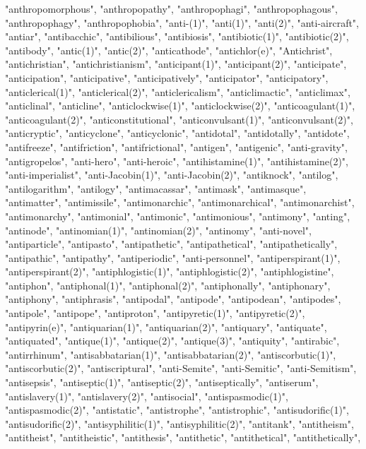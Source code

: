 "anthropomorphous",
"anthropopathy",
"anthropophagi",
"anthropophagous",
"anthropophagy",
"anthropophobia",
"anti-(1)",
"anti(1)",
"anti(2)",
"anti-aircraft",
"antiar",
"antibacchic",
"antibilious",
"antibiosis",
"antibiotic(1)",
"antibiotic(2)",
"antibody",
"antic(1)",
"antic(2)",
"anticathode",
"antichlor(e)",
"Antichrist",
"antichristian",
"antichristianism",
"anticipant(1)",
"anticipant(2)",
"anticipate",
"anticipation",
"anticipative",
"anticipatively",
"anticipator",
"anticipatory",
"anticlerical(1)",
"anticlerical(2)",
"anticlericalism",
"anticlimactic",
"anticlimax",
"anticlinal",
"anticline",
"anticlockwise(1)",
"anticlockwise(2)",
"anticoagulant(1)",
"anticoagulant(2)",
"anticonstitutional",
"anticonvulsant(1)",
"anticonvulsant(2)",
"anticryptic",
"anticyclone",
"anticyclonic",
"antidotal",
"antidotally",
"antidote",
"antifreeze",
"antifriction",
"antifrictional",
"antigen",
"antigenic",
"anti-gravity",
"antigropelos",
"anti-hero",
"anti-heroic",
"antihistamine(1)",
"antihistamine(2)",
"anti-imperialist",
"anti-Jacobin(1)",
"anti-Jacobin(2)",
"antiknock",
"antilog",
"antilogarithm",
"antilogy",
"antimacassar",
"antimask",
"antimasque",
"antimatter",
"antimissile",
"antimonarchic",
"antimonarchical",
"antimonarchist",
"antimonarchy",
"antimonial",
"antimonic",
"antimonious",
"antimony",
"anting",
"antinode",
"antinomian(1)",
"antinomian(2)",
"antinomy",
"anti-novel",
"antiparticle",
"antipasto",
"antipathetic",
"antipathetical",
"antipathetically",
"antipathic",
"antipathy",
"antiperiodic",
"anti-personnel",
"antiperspirant(1)",
"antiperspirant(2)",
"antiphlogistic(1)",
"antiphlogistic(2)",
"antiphlogistine",
"antiphon",
"antiphonal(1)",
"antiphonal(2)",
"antiphonally",
"antiphonary",
"antiphony",
"antiphrasis",
"antipodal",
"antipode",
"antipodean",
"antipodes",
"antipole",
"antipope",
"antiproton",
"antipyretic(1)",
"antipyretic(2)",
"antipyrin(e)",
"antiquarian(1)",
"antiquarian(2)",
"antiquary",
"antiquate",
"antiquated",
"antique(1)",
"antique(2)",
"antique(3)",
"antiquity",
"antirabic",
"antirrhinum",
"antisabbatarian(1)",
"antisabbatarian(2)",
"antiscorbutic(1)",
"antiscorbutic(2)",
"antiscriptural",
"anti-Semite",
"anti-Semitic",
"anti-Semitism",
"antisepsis",
"antiseptic(1)",
"antiseptic(2)",
"antiseptically",
"antiserum",
"antislavery(1)",
"antislavery(2)",
"antisocial",
"antispasmodic(1)",
"antispasmodic(2)",
"antistatic",
"antistrophe",
"antistrophic",
"antisudorific(1)",
"antisudorific(2)",
"antisyphilitic(1)",
"antisyphilitic(2)",
"antitank",
"antitheism",
"antitheist",
"antitheistic",
"antithesis",
"antithetic",
"antithetical",
"antithetically",
